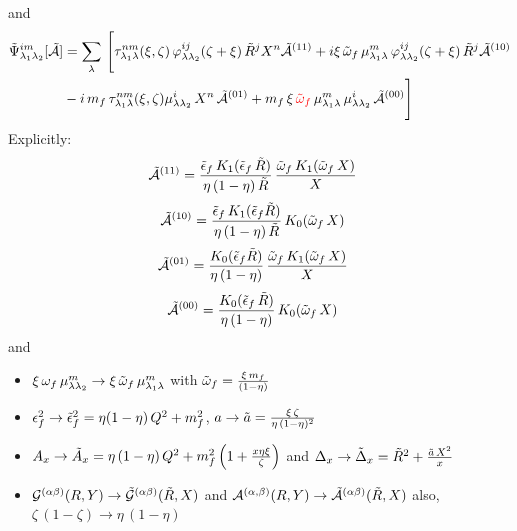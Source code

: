 \documentclass[9pt]{article}
\newif\ifmarked \markedtrue
\newcommand{\chg}[1]{\ifmarked{\color{red}#1}\else{#1}\fi}
\numberwithin{equation}{section}
\begin{document}
and
\begin{align}
  \Tilde{\Psi}^{im}_{\lambda_{1}\lambda_{2}}[\Tilde{\mathcal{A}}] & = \sum_{\lambda}\, \Bigg[\tau^{nm}_{\lambda_{1}\lambda}(\xi,\zeta)\,\varphi^{ij}_{\lambda\lambda_{2}}(\zeta + \xi)\,\Tilde{R}^{j}X^{n}\Tilde{\mathcal{A}}^{(11)}+i\xi\,\Tilde{\omega}_{f}\,\mu^{m}_{\lambda_{1}\lambda}\,\varphi^{ij}_{\lambda\lambda_{2}}(\zeta + \xi)\,\Tilde{R}^{j}\Tilde{\mathcal{A}}^{(10)}\notag \\ & -i\,m_{f}\,\tau^{nm}_{\lambda_{1}\lambda}(\xi,\zeta)\mu^{i}_{\lambda\lambda_{2}}\,X^{n}\,\Tilde{\mathcal{A}}^{(01)} + m_{f}\,\xi\,\chg{\Tilde{\omega}_{f}}\,\mu^{m}_{\lambda_{1}\lambda}\,\mu^{i}_{\lambda\lambda_{2}}\,\Tilde{\mathcal{A}}^{(00)}\Bigg]  
\label{chg:omq}\end{align}
Explicitly: 
\begin{align}
    \mathcal{\Tilde{A}}^{(11)} & = \frac{\Tilde{\epsilon}_{f}\,K_{1}(\Tilde{\epsilon}_{f}\,\Tilde{R})}{\eta\,(1-\eta)\,\Tilde{R}}\, \frac{\Tilde{\omega}_{f}\,K_{1}(\Tilde{\omega}_{f}\,X)}{X}
\end{align}
\begin{align}
    \mathcal{\Tilde{A}}^{(10)} & = \frac{\Tilde{\epsilon}_{f}\,K_{1}(\Tilde{\epsilon}_{f}\Tilde{R})}{\eta\,(1-\eta)\,\Tilde{R}}\, K_{0}(\Tilde{\omega}_{f}\,X)
\end{align}
\begin{align}
    \mathcal{\Tilde{A}}^{(01)} & =   \frac{K_{0}(\Tilde{\epsilon}_{f}\Tilde{R})}{\eta\,(1-\eta)}\,\frac{\Tilde{\omega}_{f}\,K_{1}(\Tilde{\omega}_{f}\,X)}{X}
\end{align}
\begin{align}
    \mathcal{\Tilde{A}}^{(00)} & = \frac{K_{0}(\Tilde{\epsilon}_{f}\,\Tilde{R})}{\eta\,(1-\eta)}\, K_{0}(\Tilde{\omega}_{f}\,X)
\end{align}
and 
\begin{itemize}
 \item $\xi\, \omega_{f}\,\mu^{m}_{\lambda\lambda_{2}} \rightarrow \xi\, \Tilde{\omega}_{f}\,\mu^{m}_{\lambda_{1}\lambda}$ with $\Tilde{\omega}_{f} = \frac{\xi\,m_{f}}{(1-\eta)}$
    \item $\epsilon^{2}_{f} \rightarrow \Tilde{\epsilon}^{2}_{f} = \eta(1-\eta)\, Q^{2} + m^{2}_{f}$, $a \rightarrow \Tilde{a} = \frac{\xi\,\zeta}{\eta\, (1-\eta)^{2}}$
    \item $A_{x} \rightarrow \Tilde{A}_{x} = \eta\,(1-\eta)\,Q^{2} + m^{2}_{f}\left(1+\frac{x\eta\xi}{\zeta}\right)$ and $\Delta_{x} \rightarrow \Tilde{\Delta}_{x} = \Tilde{R}^{2} + \frac{\Tilde{a}\,X^{2}}{x}$
    \item $\mathcal{G}^{(\alpha\beta)}(R,Y) \rightarrow \mathcal{\Tilde{G}}^{(\alpha\beta)}(\Tilde{R},X) $ and $\mathcal{A}^{(\alpha,\beta)}(R,Y) \rightarrow \mathcal{\Tilde{A}}^{(\alpha\beta)}(\Tilde{R},X)$ also, $\zeta\,(1-\zeta) \rightarrow \eta\,(1-\eta)$
\end{itemize}
\end{document}
